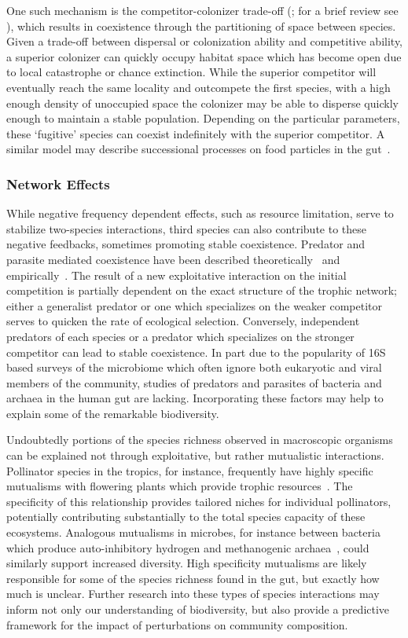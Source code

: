 \documentclass[12pt]{article}
\begin{document}
One such mechanism is the competitor-colonizer trade-off
(\citealp{Levins1971}; for a brief review see \citealp{Yu2001}),
which results in coexistence through the partitioning of space between species.
Given a trade-off between dispersal or colonization ability
and competitive ability,
a superior colonizer can quickly occupy habitat space which has become open
due to local catastrophe or chance extinction.
While the superior competitor will eventually reach the same locality
and outcompete the first species,
with a high enough density of unoccupied space
the colonizer may be able to disperse quickly enough to maintain a stable
population.
Depending on the particular parameters,
these `fugitive' species can coexist indefinitely with the superior competitor.
A similar model may describe successional processes
on food particles in the gut~\citep{TODO}.

\subsubsection{Network Effects}
While negative frequency dependent effects,
such as resource limitation,
serve to stabilize two-species interactions,
third species can also contribute to these negative feedbacks,
sometimes promoting stable coexistence.
Predator and parasite mediated coexistence have been described
theoretically~\citep{Caswell1978} and
empirically~\citep{Paine1966,TODO}.
The result of a new exploitative interaction on the initial
competition is partially dependent on the exact structure of the
trophic network;
either a generalist predator or one which specializes on the weaker
competitor serves to quicken the rate of ecological selection.
Conversely, independent predators of each species or a predator
which specializes on the stronger competitor can lead to stable
coexistence.
In part due to the popularity of 16S based surveys of the
microbiome
which often ignore both eukaryotic
and viral members of the community,
studies of predators and parasites of bacteria and archaea
in the human gut are lacking.
Incorporating these factors may help to explain some of the
remarkable biodiversity.

Undoubtedly portions of the species richness observed in macroscopic
organisms can be explained not through exploitative,
but rather mutualistic interactions.
Pollinator species in the tropics, for instance, frequently
have highly specific mutualisms with flowering plants which
provide trophic resources~\citep{TODO}.
The specificity of this relationship provides tailored niches
for individual pollinators, potentially contributing substantially
to the total species capacity of these ecosystems.
Analogous mutualisms in microbes, for instance
between bacteria which produce auto-inhibitory hydrogen
and methanogenic archaea~\citep{TODO}, could similarly support increased
diversity.
High specificity mutualisms are likely responsible for some of the species
richness found in the gut,
but exactly how much is unclear.
Further research into these types of species interactions
may inform not only our understanding of biodiversity,
but also provide a predictive framework for the impact of
perturbations on community composition.
\end{document}
